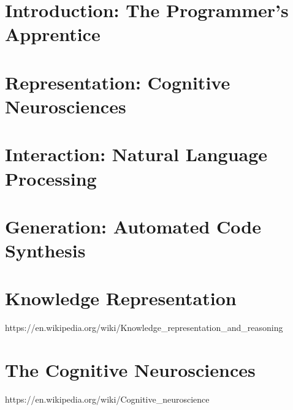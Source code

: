 
\section{Introduction: The Programmer's Apprentice}  %
\section{Representation: Cognitive Neurosciences}    %
\section{Interaction: Natural Language Processing}    %
\section{Generation: Automated Code Synthesis}      %


\section{Knowledge Representation} https://en.wikipedia.org/wiki/Knowledge_representation_and_reasoning ~\cite{Brachmanetal2004}
\section{The Cognitive Neurosciences} https://en.wikipedia.org/wiki/Cognitive_neuroscience ~\cite{Gazzaniga2009}


